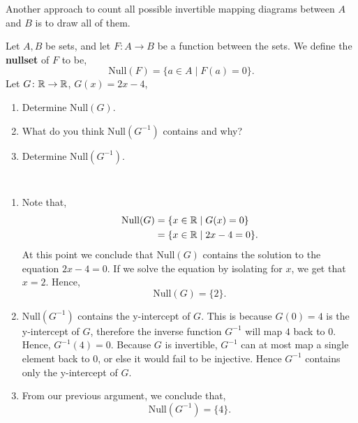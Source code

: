 \documentclass[12pt]{article} %
\begin{document}
\begin{solution}[\textbf{2}]
  Another approach to count all possible invertible mapping diagrams between $A$ and $B$ is to draw all of them.
\end{solution}

\begin{qstn}
  Let $A,B$ be sets, and let  $F \colon A \to B$ be a function between the sets. We define the \textbf{nullset} of
  $F$ to be,
  \[
        \text{Null}(F) = \{a \in A \mid F(a) = 0\} 
  .\] 
  Let $G \colon \mathbb R \to \mathbb R$, $G(x) = 2x - 4$,
   \begin{enumerate}[label=(\alph*)]
     \item Determine $\text{Null}(G)$.
     \item What do you think $\text{Null}(G^{-1})$ contains and why?
     \item Determine $\text{Null}(G^{-1})$.
  \end{enumerate}
  \begin{solution}\texttt{   }
    \begin{enumerate}[label=(\alph*)]
      \item Note that,
        \begin{align*}
          \text{Null}(G) &= \{x \in \mathbb R \mid G(x) = 0\}\\
                         &= \{x \in \mathbb R \mid 2x - 4 = 0\} 
        .\end{align*}
        At this point we conclude that $\text{Null}(G)$ contains the solution to the equation $2x - 4 = 0$.
        If we solve the equation by isolating for $x$, we get that $x = 2$. Hence,
        \[
           \text{Null}(G) = \{2\}  
        .\] 
      \item $\text{Null}(G^{-1})$ contains the y-intercept of $G$. This is because $G(0) = 4$ is the y-intercept of
        $G$, therefore the inverse function $G^{-1}$ will map $4$ back to $0$. Hence, $G^{-1}(4) = 0$. Because $G$ 
        is invertible, $G^{-1}$ can at most map a single element back to $0$, or else it would fail to be
        injective. Hence $G^{-1}$ contains only the y-intercept of $G$.

      \item From our previous argument, we conclude that,
        \[
              \text{Null}(G^{-1}) = \{4\} 
        .\] 
    \end{enumerate}
  \end{solution}
  
\end{qstn}
\end{document}
